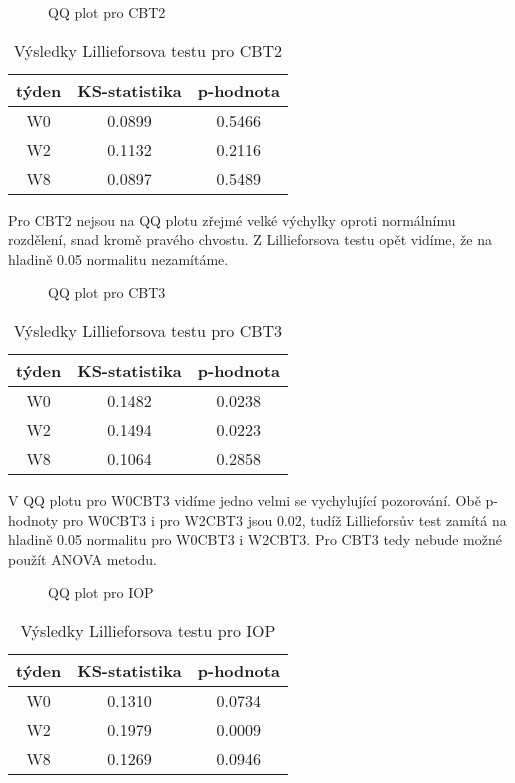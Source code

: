 \documentclass{article}
\begin{document}
\begin{figure}[H]
  \centering
    
    \caption{QQ plot pro CBT2}
\end{figure}

\begin{table}[H]
  \small
  \centering
  \caption{Výsledky Lillieforsova testu pro CBT2}
  \begin{tabular}{|ccc|}
    \hline
    týden & KS-statistika & p-hodnota\\
    \hline
    W0 & 0.0899 & 0.5466\\
    W2 & 0.1132 & 0.2116\\
    W8 & 0.0897 & 0.5489\\
    \hline
  \end{tabular}
\end{table}

Pro CBT2 nejsou na QQ plotu zřejmé velké výchylky oproti normálnímu rozdělení, snad kromě pravého chvostu.
Z Lillieforsova testu opět vidíme, že na hladině 0.05 normalitu nezamítáme.

\begin{figure}[H]
  \centering
    
    \caption{QQ plot pro CBT3}
\end{figure}


\begin{table}[H]
  \small
  \centering
  \caption{Výsledky Lillieforsova testu pro CBT3}
  \begin{tabular}{|ccc|}
    \hline
    týden & KS-statistika & p-hodnota\\
    \hline
    W0 & 0.1482 & 0.0238\\
    W2 & 0.1494 & 0.0223\\
    W8 & 0.1064 & 0.2858\\
    \hline
  \end{tabular}
\end{table}

V QQ plotu pro W0CBT3 vidíme jedno velmi se vychylující pozorování.
Obě p-hodnoty pro W0CBT3 i pro W2CBT3 jsou 0.02, tudíž Lillieforsův test zamítá na hladině 0.05 normalitu pro W0CBT3 i W2CBT3.
Pro CBT3 tedy nebude možné použít ANOVA metodu.

\begin{figure}[H]
  \centering
    
    \caption{QQ plot pro IOP}
\end{figure}

\begin{table}[H]
  \small
  \centering
  \caption{Výsledky Lillieforsova testu pro IOP}
  \begin{tabular}{|ccc|}
    \hline
    týden & KS-statistika & p-hodnota\\
    \hline
    W0 & 0.1310 & 0.0734\\
    W2 & 0.1979 & 0.0009\\
    W8 & 0.1269 & 0.0946\\
    \hline
  \end{tabular}
\end{table}
\end{document}
